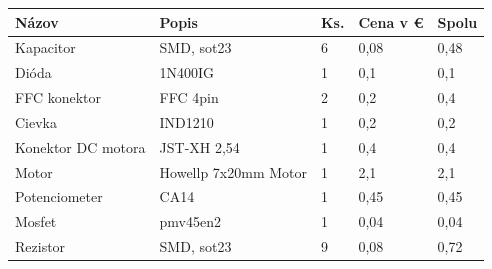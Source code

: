 \begin{table}
	\begin{tabular}{p{} p{} p{} p{} p{}}
		\hline
		\multicolumn{1}{|l}{\textbf{Názov}} & \textbf{Popis}                                     & \multicolumn{1}{l}{\textbf{Ks.}} & \multicolumn{1}{l}{\textbf{Cena v \euro}} & \multicolumn{1}{l|}{\textbf{Spolu}} \\ \hline
		Kapacitor                           & SMD, sot23                                         & 6                                  & 0,08                                      & 0,48                                        \\
		Dióda                               & 1N400IG                                            & 1                                  & 0,1                                      & 0,1                                        \\
		FFC konektor                        & FFC 4pin                                           & 2                                  & 0,2                                      & 0,4                                        \\
		Cievka                              & IND1210                                            & 1                                  & 0,2                                      & 0,2                                        \\
		Konektor DC motora                  & JST-XH 2,54                                        & 1                                  & 0,4                                      & 0,4                                        \\
		Motor                               & Howellp 7x20mm Motor                               & 1                                  & 2,1                                      & 2,1                                        \\
		Potenciometer                       & CA14                                               & 1                                  & 0,45                                     & 0,45                                       \\
		Mosfet                              & pmv45en2                                           & 1                                  & 0,04                                     & 0,04                                       \\
		Rezistor                            & SMD, sot23                                         & 9                                  & 0,08                                      & 0,72                                        \\

\end{tabular}
\end{table}
